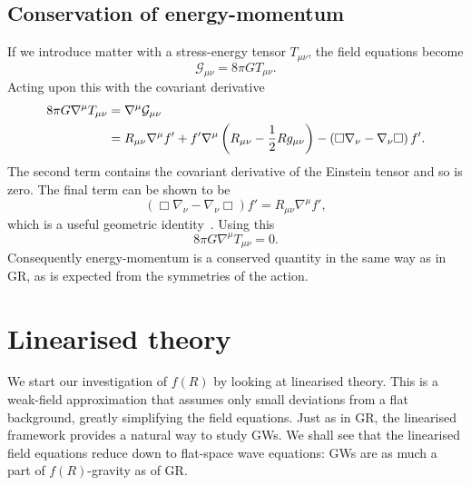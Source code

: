 \subsection{Conservation of energy-momentum}

If we introduce matter with a stress-energy tensor $T_{\mu\nu}$, the field equations become
\begin{equation}
\mathcal{G}_{\mu\nu} = 8\pi GT_{\mu\nu}.
\end{equation}
Acting upon this with the covariant derivative
\begin{align}
8\pi G\nabla^\mu T_{\mu\nu} = {} & \nabla^\mu\mathcal{G}_{\mu\nu} \nonumber \\*
 = {} & R_{\mu\nu}\nabla^\mu f' + f'\nabla^\mu\left(R_{\mu\nu} - \frac{1}{2}R g_{\mu\nu}\right) - \left(\Box\nabla_\nu - \nabla_\nu\Box\right)f'.
\end{align}
The second term contains the covariant derivative of the Einstein tensor and so is zero. The final term can be shown to be
\begin{equation}
\left(\Box\nabla_\nu - \nabla_\nu\Box\right)f' = R_{\mu\nu}\nabla^\mu f',
\end{equation}
which is a useful geometric identity~\cite{Koivisto2006a}. Using this
\begin{equation}
8\pi G\nabla^\mu T_{\mu\nu} = 0.
\end{equation}
Consequently energy-momentum is a conserved quantity in the same way as in GR, as is expected from the symmetries of the action.

\section{Linearised theory\label{sec:Lin}}

We start our investigation of $f(R)$ by looking at linearised theory. This is a weak-field approximation that assumes only small deviations from a flat background, greatly simplifying the field equations. Just as in GR, the linearised framework provides a natural way to study GWs. We shall see that the linearised field equations reduce down to flat-space wave equations: GWs are as much a part of $f(R)$-gravity as of GR.


